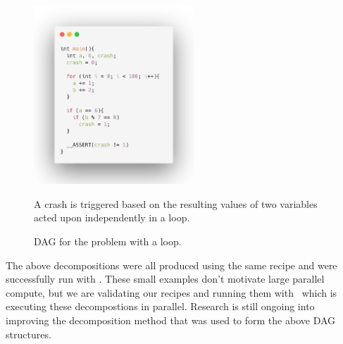 \documentclass[
10pt, %
a4paper, %
oneside, %
headinclude,footinclude, %
BCOR5mm, %
]{scrartcl}
\begin{document}
\begin{figure}
    \centering
    \begin{minipage}{0.45\textwidth}
        \centering

  \includegraphics[width=6cm]{./figs/ex3_code.png}
  \caption{A crash is triggered based on the resulting values of two variables acted upon independently in a loop.}
  \label{ex3_code}


    \end{minipage}\hfill
    \begin{minipage}{0.45\textwidth}
        \centering

  \caption{DAG for the problem with a loop.}
  \label{ex3_dag}


    \end{minipage}
\end{figure}




The above decompositions were all produced using the same recipe and were successfully run with \dagster. These small examples don't motivate large parallel compute, but we are validating our recipes and running them with \dagster\ which is executing these decompostions in parallel. Research is still ongoing into improving the decomposition method that was used to form the above DAG structures.
\end{document}

